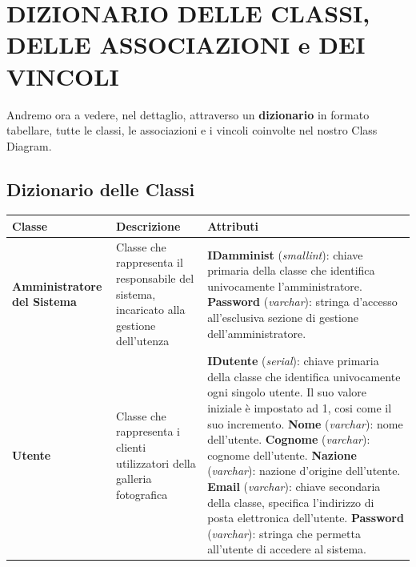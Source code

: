 \documentclass[a4paper]{article}
\begin{document}
\vspace{35pt}
\section{DIZIONARIO DELLE CLASSI, DELLE ASSOCIAZIONI e DEI VINCOLI}
\vspace{5pt}
	Andremo ora a vedere, nel dettaglio,
	attraverso un \textbf{dizionario} in formato tabellare,
	tutte le classi, le associazioni e i vincoli coinvolte
	nel nostro
	Class Diagram. 
	
	\vspace{12pt}
	\subsection{Dizionario delle Classi}
	\vspace{8pt}
	\begin{tabular}{p{90pt}p{120pt}p{150pt}}
		\hline
		\textbf{Classe} & \textbf{Descrizione} & 
		\textbf{Attributi} 
		\\
		\hline
		\hline
		\hline
		
		\textbf{Amministratore del Sistema} &
		Classe che rappresenta il responsabile del sistema,
		incaricato alla gestione dell'utenza &
		\textbf{ID\textunderscore amminist}
		(\emph{smallint}):
		chiave
		primaria della classe che identifica univocamente
		l'amministratore.\newline 
		\textbf{Password} (\emph{varchar}): stringa d'accesso
		all'esclusiva sezione di gestione
		dell'amministratore. 
		\\
		\hline
		
		\textbf{Utente} &
		Classe che rappresenta i clienti utilizzatori della
		galleria fotografica &
		\textbf{ID\textunderscore utente} (\emph{serial}):
		chiave
		primaria della classe che identifica univocamente
		ogni singolo utente. Il suo valore iniziale è
		impostato
		ad 1, cosi come il suo incremento.\newline 
		\textbf{Nome} (\emph{varchar}): nome dell'utente.
		\newline 
		\textbf{Cognome} (\emph{varchar}): cognome
		dell'utente.
		\newline
		\textbf{Nazione} (\emph{varchar}): nazione d'origine
		dell'utente.
		\newline
		\textbf{Email} (\emph{varchar}): chiave secondaria
		della classe, specifica l'indirizzo di posta
		elettronica dell'utente.\newline
		\textbf{Password} (\emph{varchar}): stringa che
		permetta all'utente di accedere al sistema.
		\\
		\hline
		

\end{tabular}
\end{document}
